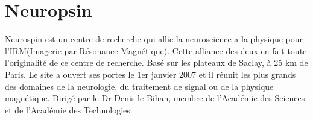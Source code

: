 \section{Neuropsin}

Neurospin est un centre de recherche qui allie la neuroscience a la physique pour l'IRM(Imagerie par Résonance Magnétique). 
Cette alliance des deux en fait toute l'originalité de ce centre de recherche. Basé sur les plateaux de Saclay, à 25 km de Paris. Le site a ouvert ses portes le 1er janvier 2007 et il réunit les plus grands des domaines de la neurologie, du traitement de signal ou de la physique magnétique. Dirigé par le Dr Denis le Bihan, membre de l’Académie des Sciences et de l'Académie des Technologies.

